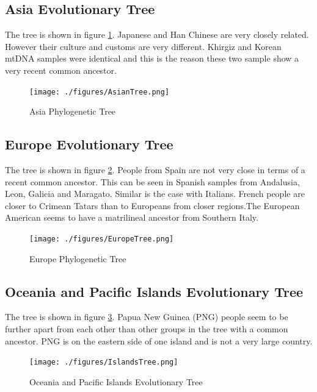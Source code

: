 \documentclass[conference]{IEEEtran}
\begin{document}
\FloatBarrier
\subsection{Asia Evolutionary Tree}

The tree is shown in figure \ref{AsianTree}. Japanese and Han Chinese are very closely related. However their culture and customs are very different. Khirgiz and Korean mtDNA samples were identical and this is the reason these two sample show a very recent common ancestor.

\begin{figure}[!t]
\centering
\texttt{[image: ./figures/AsianTree.png]}
\caption{Asia Phylogenetic Tree}
\label{AsianTree}
\end{figure}

\FloatBarrier
\subsection{Europe Evolutionary Tree}

The tree is shown in figure \ref{EuropeTree}. People from Spain are not very close in terms of a recent common ancestor. This can be seen in Spanish samples from Andalusia, Leon, Galicia and Maragato. Similar is the case with Italians. French people are closer to Crimean Tatars than to Europeans from closer regions.The European American seems to have a matrilineal ancestor from Southern Italy.


\begin{figure}[!t]
\centering
\texttt{[image: ./figures/EuropeTree.png]}
\caption{Europe Phylogenetic Tree}
\label{EuropeTree}
\end{figure}

\FloatBarrier
\subsection{Oceania and Pacific Islands Evolutionary Tree}

The tree is shown in figure \ref{IslandsTree}. Papua New Guinea (PNG) people seem to be further apart from each other than other groups in the tree with a common ancestor.
PNG is on the eastern side of one island and is not a very large country.

\begin{figure}[!t]
\centering
\texttt{[image: ./figures/IslandsTree.png]}
\caption{Oceania and Pacific Islands Evolutionary Tree}
\label{IslandsTree}
\end{figure}
\end{document}
